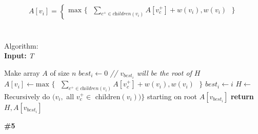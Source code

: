 \documentclass{article}
\begin{document}
\\
\begin{gather*}
A[v_i] =
\begin{cases}
\text{max } \{ \text{ } \sum_{c^{+} \in \textit{children} (v_i)} A[v_c^{+}] + w(v_i) , w(v_i) \text{ } \}
\end{cases}
\end{gather*}\\
\\
Algorithm:\\
\textbf{Input:} \textit{T}
\begin{algorithmic}
\State Make array $A$ of size $n$
\State $best_i \gets 0$ \textit{// $v_{best_i}$ will be the root of $H$}
  \State $A[v_i] \gets \text{max } \{ \text{ } \sum_{c^{+} \in \textit{children} (v_i)} A[v_c^{+}] + w(v_i) , w(v_i) \text{ } \}$
    \State $best_i \gets i$
  \EndIf
\EndFor
\State $H \gets$ Recursively do $(v_i, $ all $v_c^{+} \in $ children$(v_i))\}$ starting on root $A[v_{best_i}]$
\State \textbf{return} $H, A[v_{best_i}]$\\
\end{algorithmic}
\textbf{\#5}
\\
\\
\end{document}
